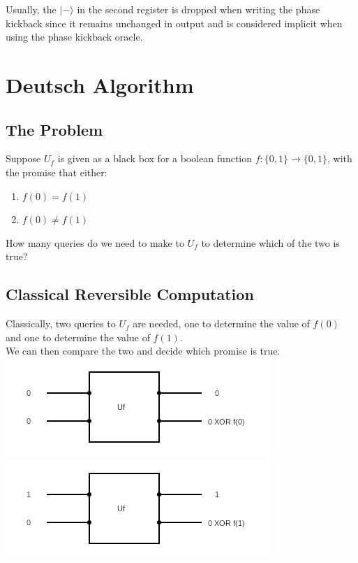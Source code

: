 \documentclass{article}
\begin{document}
Usually, the $|-\rangle$ in the second register is dropped when writing the phase kickback since it remains unchanged in output and is considered implicit when using the phase kickback oracle.

\section{Deutsch Algorithm}
\subsection{The Problem}
Suppose $U_f$ is given as a black box for a boolean function $f: \{0,1\} \rightarrow \{0,1\}$, with the promise that either:
\begin{enumerate}[label=(\roman*)]
	\item $f(0)=f(1)$
	\item $f(0) \neq f(1)$
\end{enumerate}
How many queries do we need to make to $U_f$ to determine which of the two is true?
\subsection{Classical Reversible Computation}
Classically, two queries to $U_f$ are needed, one to determine the value of $f(0)$ and one to determine the value of $f(1)$. \\
We can then compare the two and decide which promise is true.
\\ \includegraphics{classicalD0.png}
\includegraphics{classicalD1.png}
\end{document}
